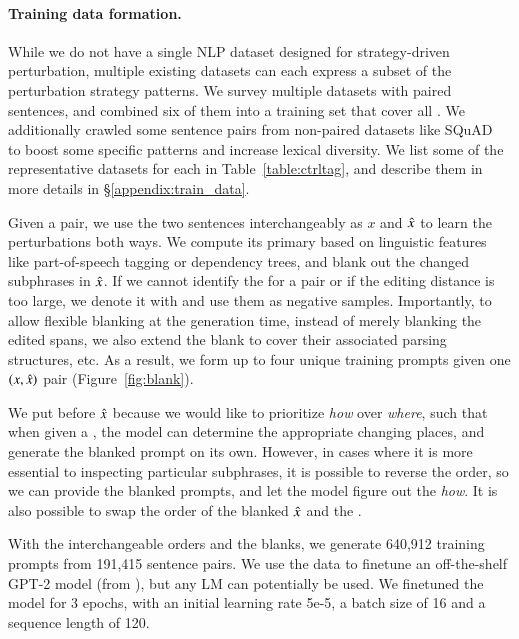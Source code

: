 \paragraph{Training data formation.}

While we do not have a single NLP dataset designed for strategy-driven perturbation, multiple existing datasets can each express a subset of the perturbation strategy patterns.
We survey multiple datasets with paired sentences, and combined six of them into a training set that cover all \tagstrs.
We additionally crawled some sentence pairs from non-paired datasets like SQuAD~\cite{rajpurkar-etal-2016-squad} to boost some specific patterns and increase lexical diversity. 
We list some of the representative datasets for each \tagstr in Table~\ref{table:ctrltag}, and describe them in more details in \S\ref{appendix:train_data}.

Given a pair, we use the two sentences interchangeably as $x$ and $\hat{x}$ to learn the perturbations both ways.
We compute its primary \tagstr based on linguistic features like part-of-speech tagging or dependency trees, and blank out the changed subphrases in $\hat{x}$.
If we cannot identify the \tagstr for a pair or if the editing distance is too large, we denote it with \ctrltag{[global]} and use them as negative samples.
Importantly, to allow flexible blanking at the generation time, instead of merely blanking the edited spans, we also extend the blank to cover their associated parsing structures, etc.
As a result, we form up to four unique training prompts given one $(x, \hat{x})$ pair (Figure~\ref{fig:blank}).


We put \tagstrs before $\hat{x}$ because we would like to prioritize \emph{how} over \emph{where}, such that when given a \tagstr, the model can determine the appropriate changing places, and generate the blanked prompt on its own. 
However, in cases where it is more essential to inspecting particular subphrases, it is possible to reverse the order, so we can provide the blanked prompts, and let the model figure out the \emph{how}.
It is also possible to swap the order of the blanked $\hat{x}$ and the \tagstrs. 

With the interchangeable orders and the blanks, we generate 640,912 training prompts from 191,415 sentence pairs.
We use the data to finetune an off-the-shelf GPT-2 model (from \citet{Wolf2019HuggingFacesTS}), but any LM can potentially be used.
We finetuned the model for 3 epochs, with an initial learning rate 5e-5, a batch size of 16 and a sequence length of 120.

